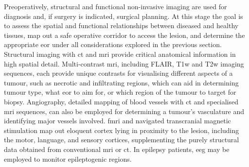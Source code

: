 Preoperatively, structural and functional non-invasive imaging are used for diagnosis and, if surgery is indicated, surgical planning.
At this stage the goal is to assess the spatial and functional relationships between diseased and healthy tissues, map out a safe operative corridor to access the lesion, and determine the appropriate \gls{eor} under all considerations explored in the previous section.
Structural imaging with \gls{ct} and \gls{mri} provide critical anatomical information in high spatial detail.
Multi-contrast \gls{mri}, including FLAIR, T1w and T2w imaging sequences, each provide unique contrasts for visualising different aspects of a tumour, such as necrotic and infiltrating regions, which can aid in determining tumour type, what \gls{eor} to aim for, or which region of the tumour to target for biopsy.
Angiography, detailed mapping of blood vessels with \gls{ct} and specialised \gls{mri} sequences, can also be employed for determining a tumour's vasculature and identifying major vessels involved\autocite{Kashimura2008,Kim2019}.
\Gls{fmri} and navigated transcranial magnetic stimulation \autocite{WeissLucas2020} map out eloquent cortex lying in proximity to the lesion, including the motor, language, and sensory cortices, supplementing the purely structural data obtained from conventional \gls{mri} or \gls{ct}.
In epilepsy patients, \gls{eeg} may be employed to monitor epileptogenic regions\autocite{Sarco2006}.

